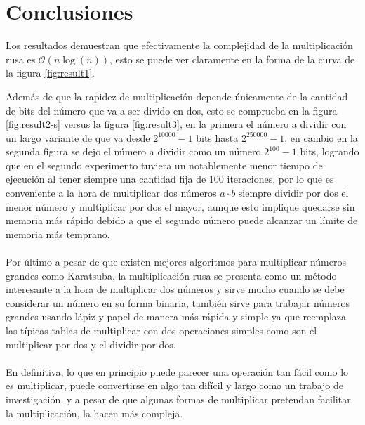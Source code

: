 \documentclass[10pt,journal,compsoc]{IEEEtran}
\begin{document}
\section{Conclusiones}

Los resultados demuestran que efectivamente la complejidad de la multiplicación rusa es $\mathcal{O}(n \log (n))$, esto se puede ver claramente en la forma de la curva de la figura \ref{fig:result1}.

Además de que la rapidez de multiplicación depende únicamente de la cantidad de bits del número que va a ser divido en dos, esto se comprueba en la figura \ref{fig:result2-s} versus la figura \ref{fig:result3}, en la primera el número a dividir con un largo variante de que va desde $2^{10000}-1$ bits hasta $2^{250000}-1$, en cambio en la segunda figura se dejo el número a dividir como un número  $2^{100}-1$ bits, logrando que en el segundo experimento tuviera un notablemente menor tiempo de ejecución al tener siempre una cantidad fija de 100 iteraciones, por lo que es conveniente a la hora de multiplicar dos números $a\cdot b$ siempre dividir por dos el menor número y multiplicar por dos el mayor, aunque esto implique quedarse sin memoria más rápido debido a que el segundo número puede alcanzar un límite de memoria más temprano.
\\\\
Por último a pesar de que existen mejores algoritmos para multiplicar números grandes como Karatsuba, la multiplicación rusa se presenta como un método interesante a la hora de multiplicar dos números y sirve mucho cuando se debe considerar un número en su forma binaria, también sirve para trabajar números grandes usando lápiz y papel de manera más rápida y simple ya que reemplaza las típicas tablas de multiplicar con dos operaciones simples como son el multiplicar por dos y el dividir por dos.
\\\\
En definitiva, lo que en principio puede parecer una operación tan fácil como lo es multiplicar, puede convertirse en algo tan difícil y largo como un trabajo de investigación, y a pesar de que algunas formas de multiplicar pretendan facilitar la multiplicación, la hacen más compleja.

\nocite{AS00}

\nocite{KPR86}

\nocite{ISO/IEC9899}

\renewcommand\refname{Bibliography}

\end{document}

